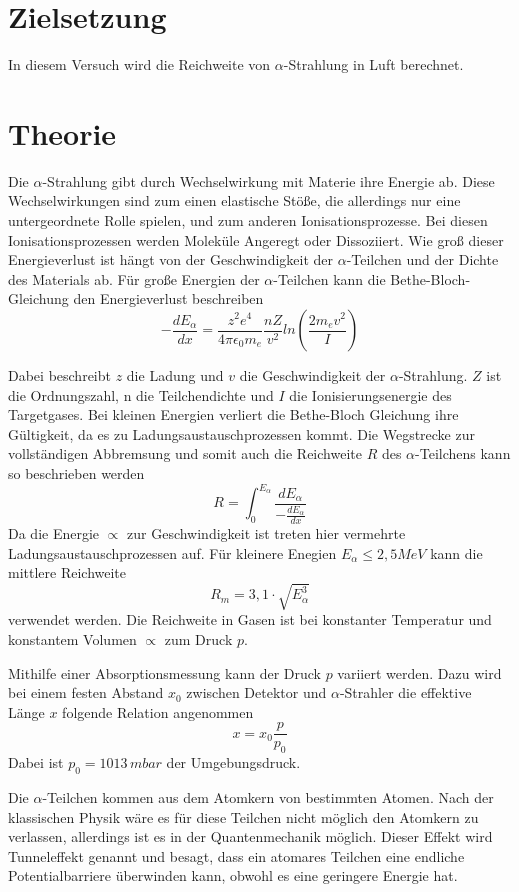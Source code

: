 \section{Zielsetzung}
In diesem Versuch wird die Reichweite von $\alpha$-Strahlung in Luft berechnet.
\section{Theorie}
Die $\alpha$-Strahlung gibt durch Wechselwirkung mit Materie ihre Energie ab.
Diese Wechselwirkungen sind zum einen elastische Stöße, die allerdings nur eine untergeordnete
Rolle spielen, und zum anderen Ionisationsprozesse. Bei diesen Ionisationsprozessen werden
Moleküle Angeregt oder Dissoziiert.
Wie groß dieser Energieverlust ist hängt von der Geschwindigkeit der $\alpha$-Teilchen und
der Dichte des Materials ab.
Für große Energien der $\alpha$-Teilchen kann die Bethe-Bloch-Gleichung
den Energieverlust beschreiben
\begin{equation*}
  -\frac{dE_{\alpha}}{dx} = \frac{z^2 e^4}{4 \pi \epsilon_0 m_e}\frac{nZ}{v^2} ln(\frac{2m_e v^2}{I})
  \label{eq:1}
\end{equation*}

Dabei beschreibt $z$ die Ladung und $v$ die Geschwindigkeit der $\alpha$-Strahlung.
$Z$ ist die Ordnungszahl, n die Teilchendichte und $I$ die Ionisierungsenergie
des Targetgases. Bei kleinen Energien verliert die Bethe-Bloch Gleichung ihre Gültigkeit,
da es zu Ladungsaustauschprozessen kommt.
Die Wegstrecke zur vollständigen Abbremsung
und somit auch die Reichweite $R$ des $\alpha$-Teilchens
kann so beschrieben werden
\begin{equation*}
  R = \int_{0}^{E_{\alpha}} \frac{dE_\alpha}{-\frac{dE_{\alpha}}{dx}}
  \label{eq:2}
\end{equation*}
Da die Energie $\propto $ zur Geschwindigkeit ist treten hier vermehrte Ladungsaustauschprozessen auf.
Für kleinere Enegien $E_\alpha \leq 2,5 MeV$ kann die mittlere Reichweite
\begin{equation}
  R_m= 3,1 \cdot \sqrt{E^3_\alpha}
  \label{eq:3}
\end{equation}
verwendet werden.
Die Reichweite in Gasen ist bei konstanter Temperatur und konstantem Volumen $\propto$ zum Druck $p$.

Mithilfe einer Absorptionsmessung kann der Druck $p$ variiert werden. Dazu
wird bei einem festen Abstand $x_0$ zwischen Detektor und $\alpha$-Strahler die
effektive Länge $x$ folgende Relation angenommen
\begin{equation}
  x = x_0 \frac{p}{p_0}
  \label{eq:4}
\end{equation}
Dabei ist $p_0 = 1013 \, mbar$ der Umgebungsdruck.

Die $\alpha$-Teilchen kommen aus dem Atomkern von bestimmten Atomen. Nach der klassischen Physik
wäre es für diese Teilchen nicht möglich den Atomkern zu verlassen, allerdings ist
es in der Quantenmechanik möglich. Dieser Effekt wird Tunneleffekt genannt und besagt,
dass ein atomares Teilchen eine endliche Potentialbarriere überwinden kann, obwohl es eine geringere
Energie hat.
